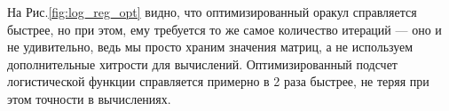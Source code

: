 \documentclass{article}
\begin{document}
	На Рис.\ref{fig:log_reg_opt} видно, что оптимизированный оракул справляется быстрее, но при этом, ему требуется то же самое количество итераций --- оно и не удивительно, ведь мы просто храним значения матриц, а не используем дополнительные хитрости для вычислений. Оптимизированный подсчет логистической функции справляется примерно в 2 раза быстрее, не теряя при этом точности в вычислениях.
	
	
	
	
	
	
\end{document}
